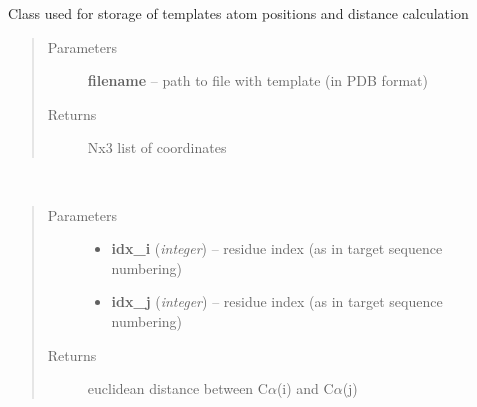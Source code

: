\documentclass[letterpaper,10pt,english]{sphinxmanual}
\begin{document}
\begin{fulllineitems}
\label{api:pycabs.Template}
Class used for storage of templates atom positions and distance calculation
\begin{quote}\begin{description}
\item[{Parameters}] \leavevmode
\textbf{filename} -- path to file with template (in PDB format)

\item[{Returns}] \leavevmode
Nx3 list of coordinates

\end{description}\end{quote}

\begin{fulllineitems}
\label{api:pycabs.Template.distance}~\begin{quote}\begin{description}
\item[{Parameters}] \leavevmode\begin{itemize}
\item {} 
\textbf{idx\_i} (\emph{integer}) -- residue index (as in target sequence numbering)

\item {} 
\textbf{idx\_j} (\emph{integer}) -- residue index (as in target sequence numbering)

\end{itemize}

\item[{Returns}] \leavevmode
euclidean distance between C\(\alpha\)(i) and C\(\alpha\)(j)

\end{description}\end{quote}

\end{fulllineitems}


\end{fulllineitems}

\end{document}
